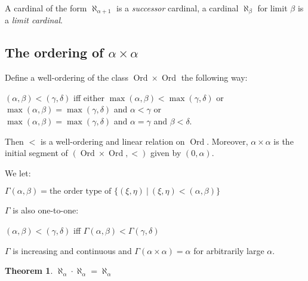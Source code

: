 \documentclass[8pt]{article}
\theoremstyle{definition}
\theoremstyle{definition}
\newtheorem{theorem}{Theorem}[section]
\theoremstyle{definition}
\theoremstyle{definition}
\theoremstyle{definition}
\theoremstyle{definition}
\theoremstyle{definition}
\theoremstyle{definition}
\theoremstyle{definition}
\theoremstyle{definition}
\theoremstyle{definition}
\theoremstyle{definition}
\theoremstyle{col}
\theoremstyle{question}
\begin{document}
A cardinal of the form $\aleph_{\alpha + 1}$ is a \emph{successor} cardinal, 
a cardinal $\aleph_{\beta}$ for limit $\beta$ is a \emph{limit cardinal}.

\subsection{The ordering of $\alpha \times \alpha$}

Define a well-ordering of the class $\operatorname{Ord} \times \operatorname{Ord}$ the following way:

\begin{center}
  $(\alpha, \beta) < (\gamma, \delta)$ iff either $\max(\alpha, \beta) < \max(\gamma, \delta)$ or \\ $\max(\alpha, \beta) = \max(\gamma, \delta)$ and $\alpha < \gamma$ or \\ $\max(\alpha, \beta) = \max(\gamma, \delta)$ and $\alpha = \gamma$ and $\beta < \delta$.
\end{center}

Then $<$ is a well-ordering and linear relation on $\operatorname{Ord}$. 
Moreover, $\alpha \times \alpha$ is the initial segment of $(\operatorname{Ord} \times \operatorname{Ord}, <)$ given by $(0, \alpha)$.

We let:

\begin{center}
  $\Gamma(\alpha, \beta) = \text{the order type of } \{ (\xi, \eta) \: | \: (\xi, \eta) < (\alpha, \beta) \}$
\end{center}

$\Gamma$ is also one-to-one:
\begin{center}
  $(\alpha, \beta) < (\gamma, \delta)$ iff $\Gamma(\alpha, \beta) < \Gamma(\gamma, \delta)$
\end{center}

$\Gamma$ is increasing and continuous and $\Gamma(\alpha \times \alpha) = \alpha$ for arbitrarily large $\alpha$.

\begin{theorem}
  $\aleph_{\alpha} \cdot \aleph_{\alpha} = \aleph_{\alpha}$
\end{theorem}
\end{document}
